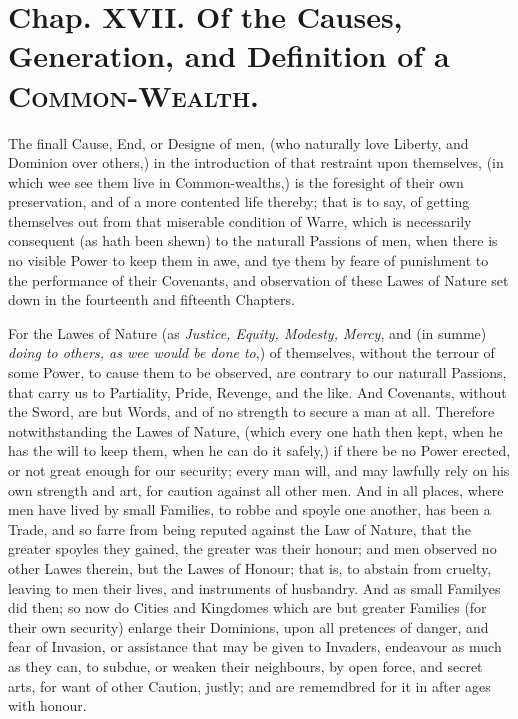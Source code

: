 
\section*{Chap. XVII. Of the Causes, Generation, and
Definition of a \textsc{Common-Wealth}.}

The finall Cause, End, or Designe of men, (who naturally love Liberty,
and Dominion over others,) in the introduction of that restraint upon
themselves, (in which wee see them live in Common-wealths,) is the
foresight of their own preservation, and of a more contented life
thereby; that is to say, of getting themselves out from that miserable
condition of Warre, which is necessarily consequent (as hath been
shewn) to the naturall Passions of men, when there is no visible Power
to keep them in awe, and tye them by feare of punishment to the
performance of their Covenants, and observation of these Lawes of
Nature set down in the fourteenth and fifteenth Chapters.

For the Lawes of Nature (as \textit{Justice, Equity, Modesty, Mercy},
and (in summe) \textit{doing to others, as wee would be done to},) of
themselves, without the terrour of some Power, to cause them to be
observed, are contrary to our naturall Passions, that carry us to
Partiality, Pride, Revenge, and the like. And Covenants, without the
Sword, are but Words, and of no strength to secure a man at all.
Therefore notwithstanding the Lawes of Nature, (which every one hath
then kept, when he has the will to keep them, when he can do it
safely,) if there be no Power erected, or not great enough for our
security; every man will, and may lawfully rely on his own strength
and art, for caution against all other men. And in all places,
 where men have lived by small Families, to robbe and spoyle
one another, has been a Trade, and so farre from being reputed against
the Law of Nature, that the greater spoyles they gained, the greater
was their honour; and men observed no other Lawes therein, but the
Lawes of Honour; that is, to abstain from cruelty, leaving to men
their lives, and instruments of husbandry. And as small Familyes did
then; so now do Cities and Kingdomes which are but greater Families
(for their own security) enlarge their Dominions, upon all pretences
of danger, and fear of Invasion, or assistance that may be given to
Invaders, endeavour as much as they can, to subdue, or weaken their
neighbours, by open force, and secret arts, for want of other Caution,
justly; and are rememdbred for it in after ages with honour.

